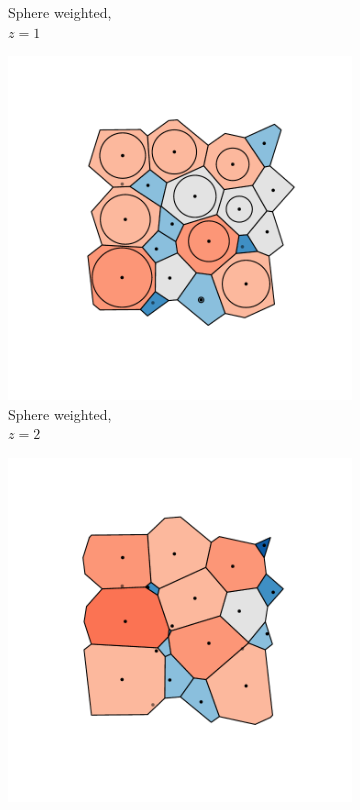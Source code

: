 \begin{figure}[tb]
\begin{subfigure}[b]{0.23\textwidth}
         \caption{Sphere weighted, \\$z=1$}
         \label{fig:cut10a}
     \end{subfigure}
     \hfill
      \begin{subfigure}[b]{0.23\textwidth}
         \centering
         \includegraphics[width=\textwidth]{./figures/quasi2d/cut_z20_a.pdf}
         \caption{Sphere weighted, \\$z=2$}
         \label{fig:cut20a}
     \end{subfigure}
     \hfill
      \begin{subfigure}[b]{0.23\textwidth}
         \centering
         \includegraphics[width=\textwidth]{./figures/quasi2d/cut_z40_a.pdf}

\end{subfigure}
\end{figure}
